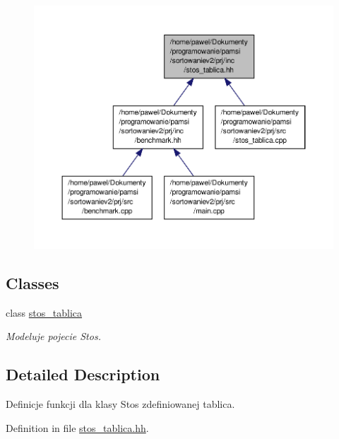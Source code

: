 \begin{figure}[H]
\begin{center}
\leavevmode
\includegraphics[width=350pt]{stos__tablica_8hh__dep__incl}
\end{center}
\end{figure}
\subsection*{Classes}
\begin{DoxyCompactItemize}
\item 
class \hyperlink{classstos__tablica}{stos\-\_\-tablica}
\begin{DoxyCompactList}\small\item\em Modeluje pojecie Stos. \end{DoxyCompactList}\end{DoxyCompactItemize}


\subsection{Detailed Description}
Definicje funkcji dla klasy Stos zdefiniowanej tablica. 

Definition in file \hyperlink{stos__tablica_8hh_source}{stos\-\_\-tablica.\-hh}.

